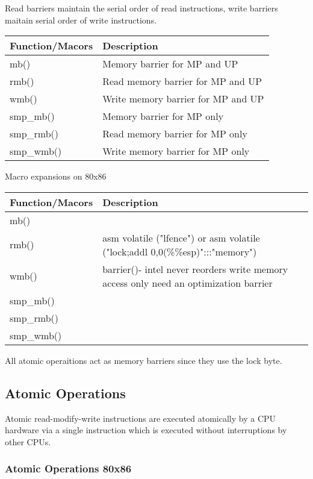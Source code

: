 \documentclass{article}
\begin{document}
Read barriers maintain the serial order of read instructions, write
barriers maitain serial order of write instructions.

\begin{center}
  \begin{tabular}{ l | l }    
    \hline
    Function/Macors & Description \\ \hline
    mb() & Memory barrier for MP and UP \\ 
    rmb() & Read memory barrier for MP and UP  \\ 
    wmb() &  Write memory barrier for MP and UP \\
    smp\_mb() &  Memory barrier for MP only \\
    smp\_rmb() &  Read memory barrier for MP only \\
    smp\_wmb() &  Write memory barrier for MP only \\
    \hline
  \end{tabular}
\end{center}
  Macro expansions on  80x86

  \begin{center}
  \begin{tabular}{ l | l }    
    \hline
    Function/Macors & Description \\ \hline
    mb() &  \\ 
    rmb() & asm volatile ("lfence") or asm volatile ("lock;addl 0,0(\%\%esp)":::"memory")  \\ 
    wmb() & barrier()- intel never reorders write memory access only need an optimization barrier  \\
    smp\_mb() &   \\
    smp\_rmb() &  \\
    smp\_wmb() &  \\
    \hline
  \end{tabular}
\end{center}

All atomic operaitions act as memory barriers since they use the lock byte.

\subsection{Atomic Operations}

Atomic read-modify-write instructions are executed atomically by a CPU
hardware via a single instruction which is executed without
interruptions by other CPUs.

\subsubsection{Atomic Operations 80x86}
\end{document}
